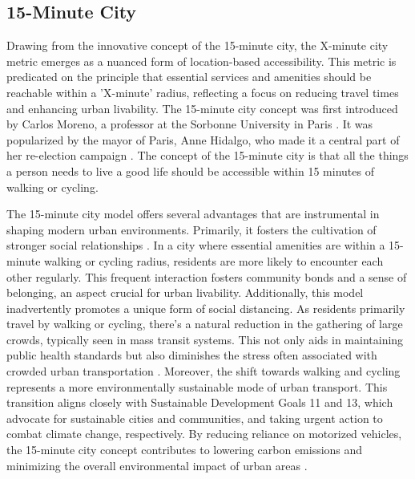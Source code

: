 \subsection{15-Minute City}
\label{subsec:15_minute_city}

Drawing from the innovative concept of the 15-minute city, the X-minute city metric emerges as a nuanced form of location-based accessibility. 
This metric is predicated on the principle that essential services and amenities should be reachable within a 'X-minute' radius, reflecting a focus on reducing travel times and enhancing urban livability.
The 15-minute city concept was first introduced by Carlos Moreno, a professor at the Sorbonne University in Paris \cite{morenoIntroducing15MinuteCity2021}.
It was popularized by the mayor of Paris, Anne Hidalgo, who made it a central part of her re-election campaign \cite{gongadzeParisVision15Minute2023}.
The concept of the 15-minute city is that all the things a person needs to live a good life should be accessible within 15 minutes of walking or cycling.

The 15-minute city model offers several advantages that are instrumental in shaping modern urban environments.
Primarily, it fosters the cultivation of stronger social relationships .
In a city where essential amenities are within a 15-minute walking or cycling radius, residents are more likely to encounter each other regularly. 
This frequent interaction fosters community bonds and a sense of belonging, an aspect crucial for urban livability.
Additionally, this model inadvertently promotes a unique form of social distancing. 
As residents primarily travel by walking or cycling, there's a natural reduction in the gathering of large crowds, typically seen in mass transit systems. 
This not only aids in maintaining public health standards but also diminishes the stress often associated with crowded urban transportation \cite{allamProximityBasedPlanning15Minute2020}.
Moreover, the shift towards walking and cycling represents a more environmentally sustainable mode of urban transport. 
This transition aligns closely with Sustainable Development Goals 11 and 13, which advocate for sustainable cities and communities, and taking urgent action to combat climate change, respectively. 
By reducing reliance on motorized vehicles, the 15-minute city concept contributes to lowering carbon emissions and minimizing the overall environmental impact of urban areas .

